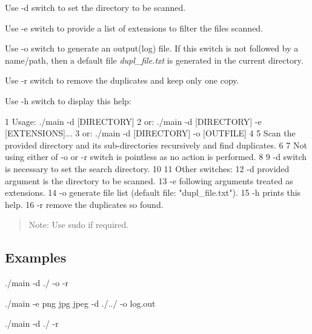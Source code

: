\begin{DoxyEnumerate}
\item Use {\ttfamily -\/d} switch to set the directory to be scanned.
\item Use {\ttfamily -\/e} switch to provide a list of extensions to filter the files scanned.
\item Use {\ttfamily -\/o} switch to generate an output(log) file. If this switch is not followed by a name/path, then a default file {\itshape dupl\+\_\+file.\+txt} is generated in the current directory.
\item Use {\ttfamily -\/r} switch to remove the duplicates and keep only one copy.
\item Use {\ttfamily -\/h} switch to display this help\+:
\end{DoxyEnumerate}


\begin{DoxyCode}
1 Usage: ./main -d [DIRECTORY]
2 or: ./main -d [DIRECTORY] -e [EXTENSIONS]...
3 or: ./main -d [DIRECTORY] -o [OUTFILE]
4 
5 Scan the provided directory and its sub-directories recursively and find duplicates.
6 
7 Not using either of -o or -r switch is pointless as no action is performed.
8 
9 -d switch is necessary to set the search directory.
10 
11 Other switches:
12     -d      provided argument is the directory to be scanned.
13     -e      following arguments treated as extensions.
14     -o      generate file list (default file: "dupl\_file.txt").
15     -h      prints this help.
16     -r      remove the duplicates so found.
\end{DoxyCode}
 \begin{quote}
Note\+: Use {\ttfamily sudo} if required. \end{quote}


\subsection*{Examples}


\begin{DoxyEnumerate}
\item {\ttfamily ./main -\/d ./ -\/o -\/r}
\item {\ttfamily ./main -\/e png jpg jpeg -\/d ./../ -\/o log.\+out}
\item {\ttfamily ./main -\/d ./ -\/r} 
\end{DoxyEnumerate}